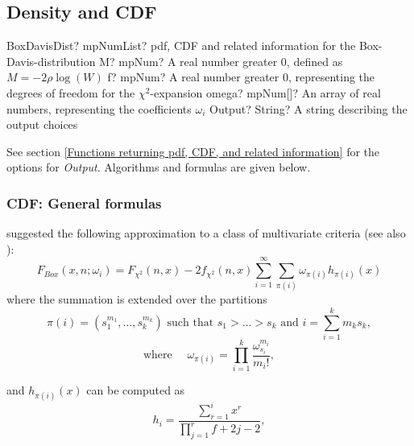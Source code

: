 \subsection{Density and CDF}

\begin{mpFunctionsExtract}
	\mpFunctionFourNotImplemented
	{BoxDavisDist? mpNumList? pdf, CDF and related information for the Box-Davis-distribution}
	{M? mpNum? A real number greater 0, defined as $M=-2 \rho \log(W)$}
	{f? mpNum? A real number greater 0, representing the degrees of freedom for the $\chi^2$-expansion}
	{omega? mpNum[]? An array of real numbers, representing the coefficients $\omega_i$}
	{Output? String? A string describing the output choices}
\end{mpFunctionsExtract}


\vspace{0.3cm}
See section \ref{Functions returning pdf, CDF, and related information} for the options for {\itshape\sffamily Output}. Algorithms and formulas are given below.



\subsubsection{CDF: General formulas}

\cite{Box_1949} suggested the following approximation to a class of multivariate criteria (see also \cite{siotani_modern_1985}):
\begin{equation}
	F_{Box}(x,n;\omega_i) = F_{\chi^2}(n, x) - 2 f_{\chi^2}(n, x) \sum_{i=1}^{\infty}{\sum_{\pi(i)}\omega_{\pi(i)} h_{\pi(i)}(x) } \label{eq:BoxCDF}
\end{equation}
where the summation is extended over the partitions
\begin{equation}
	\pi(i) = \left(s_1^{m_1},\ldots,s_k^{m_k}\right) \text{ such that } s_1 > \ldots > s_k \text{ and } i = \sum_{i=1}^k{m_k s_k}, \label{eq:BoxOmega1}
\end{equation}
\begin{equation}
	\text{where } \quad  \omega_{\pi(i)} = \prod_{i=1}^k \frac{\omega_{s_i}^{m_i}}{m_i!}, \label{eq:BoxOmega2}
\end{equation}

and $h_{\pi(i)}(x)$ can be computed as
\begin{equation}
	h_i = \frac{\sum_{r=1}^i x^r}{\prod_{j=1}^r f+2j-2}, \label{eq:BoxH1}
\end{equation}

